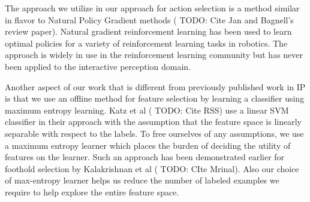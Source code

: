 The approach we utilize in our approach for action selection is a method similar in flavor to Natural Policy Gradient methods (\cite{Scharinger10_SceneModeling6D} TODO: Cite Jan and Bagnell's review paper). Natural gradient reinforcement learning has been used to learn optimal policies for a variety of reinforcement learning tasks in robotics. The approach is widely in use in the reinforcement learning community but has never been applied to the interactive perception domain.

Another aspect of our work that is different from previously published work in IP is that we use an offline method for feature selection by learning a classifier using maximum entropy learning. Katz et al (\cite{Scharinger10_SceneModeling6D} TODO: Cite RSS) use a linear SVM classifier in their approach with the assumption that the feature space is linearly separable with respect to the labels. To free ourselves of any assumptions, we use a maximum entropy learner which places the burden of deciding the utility of features on the learner. Such an approach has been demonstrated earlier for foothold selection by Kalakrishnan et al (\cite{Scharinger10_SceneModeling6D} TODO: CIte Mrinal). Also our choice of max-entropy learner helps us reduce the number of labeled examples we require to help explore the entire feature space.

